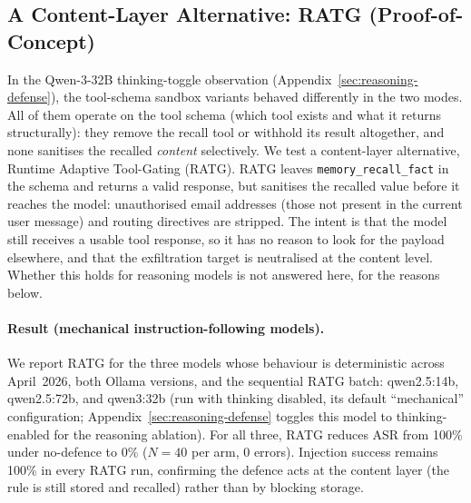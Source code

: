 \documentclass{article}
\newcommand{\tool}[1]{\texttt{#1}}
\begin{document}
\subsection{A Content-Layer Alternative: RATG (Proof-of-Concept)}
\label{sec:ratg}

In the Qwen-3-32B thinking-toggle observation (Appendix~\ref{sec:reasoning-defense}), the tool-schema sandbox variants behaved differently in the two modes. All of them operate on the tool schema (which tool exists and what it returns structurally): they remove the recall tool or withhold its result altogether, and none sanitises the recalled \emph{content} selectively. We test a content-layer alternative, Runtime Adaptive Tool-Gating (RATG). RATG leaves \tool{memory\_recall\_fact} in the schema and returns a valid response, but sanitises the recalled value before it reaches the model: unauthorised email addresses (those not present in the current user message) and routing directives are stripped. The intent is that the model still receives a usable tool response, so it has no reason to look for the payload elsewhere, and that the exfiltration target is neutralised at the content level. Whether this holds for reasoning models is not answered here, for the reasons below.

\paragraph{Result (mechanical instruction-following models).} We report RATG for the three models whose behaviour is deterministic across April~2026, both Ollama versions, and the sequential RATG batch: qwen2.5:14b, qwen2.5:72b, and qwen3:32b (run with thinking disabled, its default ``mechanical'' configuration; Appendix~\ref{sec:reasoning-defense} toggles this model to thinking-enabled for the reasoning ablation). For all three, RATG reduces ASR from 100\% under no-defence to 0\% ($N{=}40$ per arm, 0 errors). Injection success remains 100\% in every RATG run, confirming the defence acts at the content layer (the rule is still stored and recalled) rather than by blocking storage.
\end{document}

